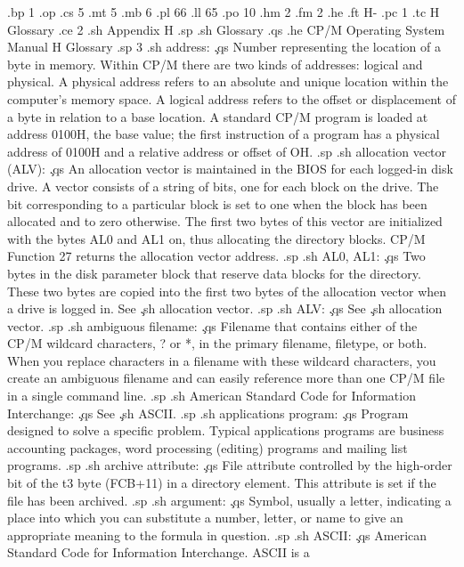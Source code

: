 .bp 1
.op
.cs 5
.mt 5
.mb 6
.pl 66
.ll 65
.po 10
.hm 2
.fm 2
.he
.ft                                H-%
.pc 1
.tc H  Glossary
.ce 2
.sh
Appendix H
.sp
.sh
Glossary
.qs
.he CP/M Operating System Manual                          H  Glossary
.sp 3
.sh
address:  \c
.qs
Number representing the location of a byte in memory.  Within 
CP/M there are two kinds of addresses:  logical and physical.  A 
physical address refers to an absolute and unique location within 
the computer's memory space.  A logical address refers to the 
offset or displacement of a byte in relation to a base location.  
A standard CP/M program is loaded at address 0100H, the base 
value; the first instruction of a program has a physical address 
of 0100H and a relative address or offset of OH.
.sp
.sh
allocation vector (ALV):  \c
.qs
An allocation vector is maintained in the BIOS for each logged-in 
disk drive.  A vector consists of a string of bits, one for each 
block on the drive.  The bit corresponding to a particular block 
is set to one when the block has been allocated and to zero 
otherwise.  The first two bytes of this vector are initialized 
with the bytes AL0 and AL1 on, thus allocating the directory 
blocks.  CP/M Function 27 returns the allocation vector address.
.sp
.sh
AL0, AL1:  \c
.qs
Two bytes in the disk parameter block that reserve data blocks 
for the directory.  These two bytes are copied into the first two 
bytes of the allocation vector when a drive is logged in.  See \c
.sh
allocation vector.
.sp
.sh
ALV:  \c
.qs
See \c
.sh
allocation vector.
.sp
.sh
ambiguous filename:  \c
.qs
Filename that contains either of the CP/M wildcard characters, ? 
or *, in the primary filename, filetype, or both.  When you 
replace characters in a filename with these wildcard characters, 
you create an ambiguous filename and can easily reference more 
than one CP/M file in a single command line.
.sp
.sh
American Standard Code for Information Interchange:  \c
.qs
See \c
.sh
ASCII.
.sp
.sh
applications program:  \c
.qs
Program designed to solve a specific problem.  Typical 
applications programs are business accounting packages, word 
processing (editing) programs and mailing list programs.
.sp
.sh
archive attribute:  \c
.qs
File attribute controlled by the high-order bit of the t3 byte 
(FCB+11) in a directory element.  This attribute is set if the 
file has been archived.
.sp
.sh
argument:  \c
.qs
Symbol, usually a letter, indicating a place into which you can 
substitute a number, letter, or name to give an appropriate 
meaning to the formula in question.
.sp
.sh
ASCII:  \c
.qs
American Standard Code for Information Interchange.  ASCII is a 
